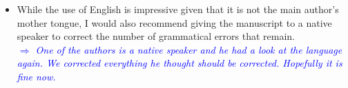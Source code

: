 \documentclass[10pt,a4paper]{article}
\newcommand{\Comment}[1]{\textsl{\textcolor{Blue}{$\Longrightarrow$ {#1}}}}
\begin{document}
\begin{itemize}
\item While the use of English is impressive given that it is not the main author's mother
tongue, I would also recommend giving the manuscript to a native speaker to correct
the number of grammatical errors that remain. \\\Comment{One of the authors is a native speaker and he had a look at the language again. We corrected everything he thought should be corrected. Hopefully it is fine now.}

\end{itemize}
\end{document}
